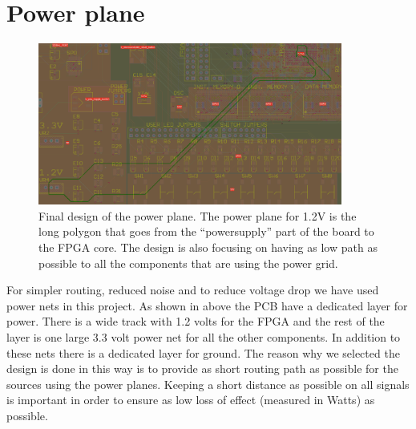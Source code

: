 \section {Power plane}

\begin{figure}
\centering
\includegraphics[width=10cm,keepaspectratio]{pcb/powerplanephoto.png}
\caption{Final design of the power plane. The power plane for 1.2V is the long polygon that goes from the ``powersupply'' part of the board to the FPGA core. The
design is also focusing on having as low path as possible to all the components that are using the power grid.  }
\label{figure:powerplanephoto}
\end{figure}

For simpler routing, reduced noise and to reduce voltage drop we have used power nets in this project.
As shown in above the PCB have a dedicated layer for power.
There is a wide track with 1.2 volts for the FPGA and the rest of the layer is one large 3.3 volt power net for all the other components.
In addition to these nets there is a dedicated layer for ground. The reason why we selected the design is done in this way is to provide as short routing path as possible for the sources using the power planes.
Keeping a short distance as possible on all signals is important in order to ensure as low loss of effect (measured in Watts) as possible.

